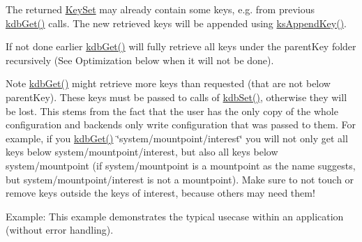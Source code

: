 The {\ttfamily returned} \hyperlink{classkdb_1_1KeySet}{Key\+Set} may already contain some keys, e.\+g. from previous \hyperlink{group__kdb_ga28e385fd9cb7ccfe0b2f1ed2f62453a1}{kdb\+Get()} calls. The new retrieved keys will be appended using \hyperlink{group__keyset_gaa5a1d467a4d71041edce68ea7748ce45}{ks\+Append\+Key()}.

If not done earlier \hyperlink{group__kdb_ga28e385fd9cb7ccfe0b2f1ed2f62453a1}{kdb\+Get()} will fully retrieve all keys under the {\ttfamily parent\+Key} folder recursively (See Optimization below when it will not be done).

\begin{DoxyNote}{Note}
\hyperlink{group__kdb_ga28e385fd9cb7ccfe0b2f1ed2f62453a1}{kdb\+Get()} might retrieve more keys than requested (that are not below parent\+Key). These keys must be passed to calls of \hyperlink{group__kdb_ga11436b058408f83d303ca5e996832bcf}{kdb\+Set()}, otherwise they will be lost. This stems from the fact that the user has the only copy of the whole configuration and backends only write configuration that was passed to them. For example, if you \hyperlink{group__kdb_ga28e385fd9cb7ccfe0b2f1ed2f62453a1}{kdb\+Get()} \char`\"{}system/mountpoint/interest\char`\"{} you will not only get all keys below system/mountpoint/interest, but also all keys below system/mountpoint (if system/mountpoint is a mountpoint as the name suggests, but system/mountpoint/interest is not a mountpoint). Make sure to not touch or remove keys outside the keys of interest, because others may need them!
\end{DoxyNote}
\begin{DoxyParagraph}{Example\+:}
This example demonstrates the typical usecase within an application (without error handling).
\end{DoxyParagraph}

